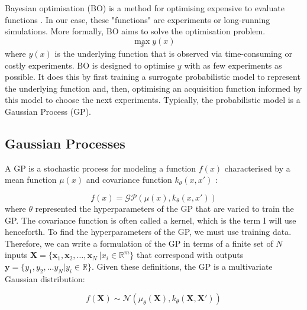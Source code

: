 Bayesian optimisation (BO) is a method for optimising expensive to evaluate functions \cite{Shahriari2016}. In our case, these "functions" are experiments or long-running simulations. More formally, BO aims to solve the optimisation problem.
\begin{equation}
    \max_x y(x)
\end{equation}
where $y(x)$ is the underlying function that is observed via time-consuming or costly experiments. BO is designed to optimise $y$ with as few experiments as possible. It does this by first training a surrogate probabilistic model to represent the underlying function and, then, optimising an acquisition function informed by this model to choose the next experiments. Typically, the probabilistic model is a Gaussian Process (GP). 

\subsection{Gaussian Processes}

A GP is a stochastic process for modeling a function $f(x)$ characterised by a mean function $\mu(x)$ and covariance function $k_{\theta}(x,x')$ \cite{Rasmussen2006}:

\begin{equation}
    f(x)= \mathcal{GP}(\mu(x), k_{\theta}(x, x'))
\end{equation}
where $\theta$ represented the hyperparameters of the GP that are varied to train the GP. The covariance function is often called a kernel, which is the term I will use henceforth. To find the hyperparameters of the GP, we must use training data. Therefore, we can write a formulation of the GP in terms of a finite set of $N$ inputs $\mathbf X = \{\mathbf x_1, \mathbf x_2, \dots, \mathbf x_N \ \vert x_i \in \mathbb R^m \}$ that correspond with outputs $\mathbf y = \{y_1, y_2, \dots y_N \vert  y_i \in \mathbb R \}$. Given these definitions, the GP is a multivariate Gaussian distribution:

\begin{equation}
    f(\mathbf X) \sim \mathcal N(\mu_{\theta}(\mathbf X), k_{\theta}(\mathbf X, \mathbf X'))
\end{equation}

